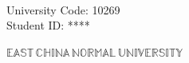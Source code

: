 \newpage

\pagestyle{empty}

\\
\hspace*{\fill} {\large University Code: 10269}\\
\hspace*{\fill} {\large Student ID: \ifnotanonymous {\stuID} \else *****\fi}

\vskip 2cm

\begin{center}
    {\Huge $\mathbb{EAST}\,\mathbb{CHINA}\,\mathbb{NORMAL}\,
            \mathbb{UNIVERSITY}$}
\end{center}

\vskip 3cm

\begin{center}
    \bfseries{\scshape{\erhao {\thesisETitle}}} \\
\end{center}

\vskip 2cm

